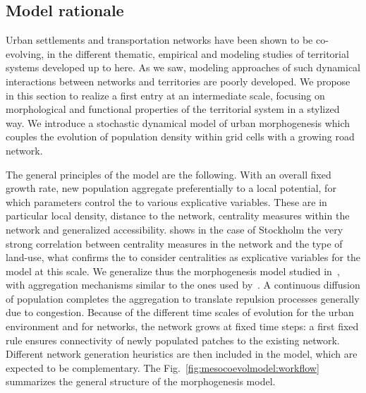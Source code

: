 \subsection{Model rationale}



Urban settlements and transportation networks have been shown to be co-evolving, in the different thematic, empirical  and modeling studies of territorial systems developed up to here. As we saw, modeling approaches of such dynamical interactions between networks and territories are poorly developed. We propose in this section to realize a first entry at an intermediate scale, focusing on morphological and functional properties of the territorial system in a stylized way. We introduce a stochastic dynamical model of urban morphogenesis which couples the evolution of population density within grid cells with a growing road network.


The general principles of the model are the following. With an overall fixed growth rate, new population aggregate preferentially to a local potential, for which parameters control the  to various explicative variables. These are in particular local density, distance to the network, centrality measures within the network and generalized accessibility. \cite{doi:10.1080/13658816.2014.893347} shows in the case of Stockholm the very strong correlation between centrality measures in the network and the type of land-use, what confirms the  to consider centralities as explicative variables for the model at this scale. We generalize thus the morphogenesis model studied in~\cite{2017arXiv170806743R}, with aggregation mechanisms similar to the ones used by~\cite{raimbault2014hybrid}. A continuous diffusion of population completes the aggregation to translate repulsion processes generally due to congestion. Because of the different time scales of evolution for the urban environment and for networks, the network grows at fixed time steps: a first fixed rule ensures connectivity of newly populated patches to the existing network. Different network generation heuristics are then included in the model, which are expected to be complementary. The Fig.~\ref{fig:mesocoevolmodel:workflow} summarizes the general structure of the morphogenesis model.



